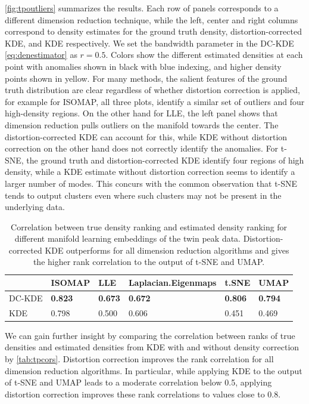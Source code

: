 \documentclass[12pt]{article}
\begin{document}
\autoref{fig:tpoutliers} summarizes the results. Each row of panels corresponds to a different dimension reduction technique, while the left, center and right columns correspond to density estimates for the ground truth density, distortion-corrected KDE, and KDE respectively. We set the bandwidth parameter in the DC-KDE \eqref{eq:denestimator} as \(r=0.5\). Colors show the different estimated densities at each point with anomalies shown in black with blue indexing, and higher density points shown in yellow. For many methods, the salient features of the ground truth distribution are clear regardless of whether distortion correction is applied, for example for ISOMAP, all three plots, identify a similar set of outliers and four high-density regions. On the other hand for LLE, the left panel shows that dimension reduction pulls outliers on the manifold towards the center. The distortion-corrected KDE can account for this, while KDE without distortion correction on the other hand does not correctly identify the anomalies. For t-SNE, the ground truth and distortion-corrected KDE identify four regions of high density, while a KDE estimate without distortion correction seems to identify a larger number of modes. This concurs with the common observation that t-SNE tends to output clusters even where such clusters may not be present in the underlying data.

\begin{table}

\caption{\label{tab:tpcors}Correlation between true density ranking and estimated density ranking for different manifold learning embeddings of the twin peak data. Distortion-corrected KDE outperforms for all dimension reduction algorithms and gives the higher rank correlation to the output of t-SNE and UMAP.}
\centering
\begin{tabular}[t]{l>{}l>{}l>{}l>{}l>{}l}
\toprule
  & ISOMAP & LLE & Laplacian.Eigenmaps & t.SNE & UMAP\\
\midrule
DC-KDE & \textbf{0.823} & \textbf{0.673} & \textbf{0.672} & \textbf{0.806} & \textbf{0.794}\\
KDE & 0.798 & 0.500 & 0.606 & 0.451 & 0.469\\
\bottomrule
\end{tabular}
\end{table}

We can gain further insight by comparing the correlation between ranks of true densities and estimated densities from KDE with and without density correction by \autoref{tab:tpcors}. Distortion correction improves the rank correlation for all dimension reduction algorithms. In particular, while applying KDE to the output of t-SNE and UMAP leads to a moderate correlation below 0.5, applying distortion correction improves these rank correlations to values close to 0.8.
\end{document}
